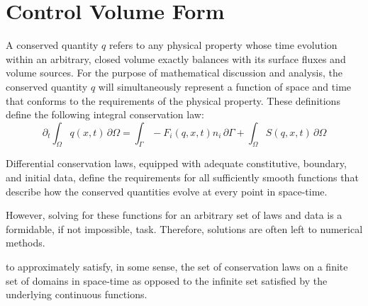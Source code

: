 \documentclass[Prelim,12pt]{WisconsinThesis}
\newcommand{\pdt}{\partial_t}
\newcommand{\V}  {\ensuremath{\Omega}}
\newcommand{\dV} {\,\partial\V}
\newcommand{\IntV} {\int_{\V}}
\renewcommand{\S}  {\ensuremath{\Gamma}}
\newcommand{\dS} {\,\partial\S}
\newcommand{\IntS} {\int_{\S}}
\newcommand{\q}{\ensuremath{q}}
\begin{document}
\section{Control Volume Form}

A conserved quantity \q{} refers to any physical property whose time evolution within an arbitrary, closed volume exactly balances with its surface fluxes and volume sources.
For the purpose of mathematical discussion and analysis, the conserved quantity \q{} will simultaneously represent a function of space and time that conforms to the requirements of the physical property.
These definitions define the following integral conservation law:
\begin{equation}
    \pdt \IntV \q(x,t) \dV = \IntS -F_i(q,x,t) n_i\dS + \IntV S(q,x,t) \dV
\end{equation}

Differential conservation laws, equipped with adequate constitutive, boundary, and initial data, define the requirements for all sufficiently smooth functions that describe how the conserved quantities evolve at every point in space-time.

However, solving for these functions for an arbitrary set of laws and data is a formidable, if not impossible, task.
Therefore, solutions are often left to numerical methods.

to approximately satisfy, in some sense, the set of conservation laws on a finite set of domains in space-time as opposed to the infinite set satisfied by the underlying continuous functions.
\end{document}
